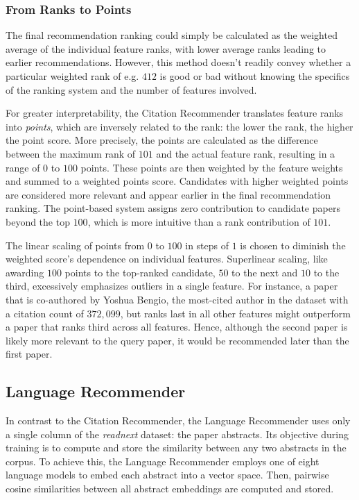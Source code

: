 \subsubsection*{From Ranks to Points}

The final recommendation ranking could simply be calculated as the weighted average of the individual feature ranks, with lower average ranks leading to earlier recommendations. However, this method doesn't readily convey whether a particular weighted rank of e.g. $412$ is good or bad without knowing the specifics of the ranking system and the number of features involved.

For greater interpretability, the Citation Recommender translates feature ranks into \emph{points}, which are inversely related to the rank: the lower the rank, the higher the point score.
More precisely, the points are calculated as the difference between the maximum rank of $101$ and the actual feature rank, resulting in a range of $0$ to $100$ points.
These points are then weighted by the feature weights and summed to a weighted points score. Candidates with higher weighted points are considered more relevant and appear earlier in the final recommendation ranking.
The point-based system assigns zero contribution to candidate papers beyond the top $100$, which is more intuitive than a rank contribution of $101$.

The linear scaling of points from $0$ to $100$ in steps of $1$ is chosen to diminish the weighted score's dependence on individual features.
Superlinear scaling, like awarding $100$ points to the top-ranked candidate, $50$ to the next and $10$ to the third, excessively emphasizes outliers in a single feature.
For instance, a paper that is co-authored by Yoshua Bengio, the most-cited author in the dataset with a citation count of $372,099$, but ranks last in all other features might outperform a paper that ranks third across all features.
Hence, although the second paper is likely more relevant to the query paper, it would be recommended later than the first paper.


\subsection{Language Recommender} \label{sec:language-recommender}

In contrast to the Citation Recommender, the Language Recommender uses only a single column of the \emph{readnext} dataset: the paper abstracts. Its objective during training is to compute and store the similarity between any two abstracts in the corpus. To achieve this, the Language Recommender employs one of eight language models to embed each abstract into a vector space. Then, pairwise cosine similarities between all abstract embeddings are computed and stored.

